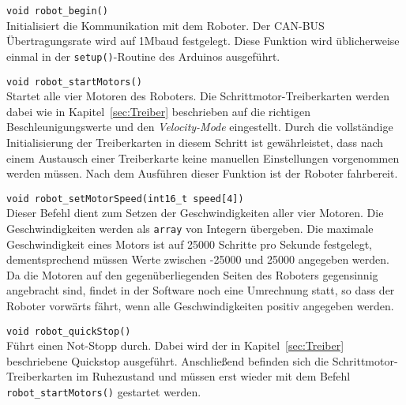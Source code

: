 \begin{description}
\item \lstinline{void robot_begin()} \\
Initialisiert die Kommunikation mit dem Roboter. Der CAN-BUS Übertragungsrate wird auf 1Mbaud festgelegt. Diese Funktion wird üblicherweise einmal in der \lstinline{setup()}-Routine des Arduinos ausgeführt.

\item \lstinline{void robot_startMotors()} \\
Startet alle vier Motoren des Roboters.
Die Schrittmotor-Treiberkarten werden dabei wie in Kapitel~\ref{sec:Treiber} beschrieben auf die richtigen Beschleunigungswerte und den \emph{Velocity-Mode} eingestellt.
Durch die vollständige Initialisierung der Treiberkarten in diesem Schritt ist gewährleistet, dass nach einem Austausch einer Treiberkarte keine manuellen Einstellungen vorgenommen werden müssen.
Nach dem Ausführen dieser Funktion ist der Roboter fahrbereit.

\item \lstinline{void robot_setMotorSpeed(int16_t speed[4])} \\
Dieser Befehl dient zum Setzen der Geschwindigkeiten aller vier Motoren.
Die Geschwindigkeiten werden als \lstinline{array} von Integern übergeben.
Die maximale Geschwindigkeit eines Motors ist auf 25000 Schritte pro Sekunde festgelegt, dementsprechend müssen Werte zwischen -25000 und 25000 angegeben werden.
Da die Motoren auf den gegenüberliegenden Seiten des Roboters gegensinnig angebracht sind, findet in der Software noch eine Umrechnung statt, so dass der Roboter vorwärts fährt, wenn alle Geschwindigkeiten positiv angegeben werden.

\item \lstinline{void robot_quickStop()} \\
Führt einen Not-Stopp durch. Dabei wird der in Kapitel~\ref{sec:Treiber} beschriebene Quickstop ausgeführt.
Anschließend befinden sich die Schrittmotor-Treiberkarten im Ruhezustand und müssen erst wieder mit dem Befehl \lstinline{robot_startMotors()} gestartet werden.
\end{description}
